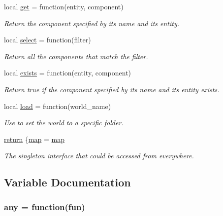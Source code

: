 \begin{DoxyCompactItemize}
local \hyperlink{world_8lua_a9c57eef25270a48365249a68581a1247}{get} = function(entity, component)
\begin{DoxyCompactList}\small\item\em Return the component specified by its name and its entity. \end{DoxyCompactList}\item 
local \hyperlink{world_8lua_ae180890d7caabe9962d544350eca4638}{select} = function(filter)
\begin{DoxyCompactList}\small\item\em Return all the components that match the filter. \end{DoxyCompactList}\item 
local \hyperlink{world_8lua_a6ba751bf71957124ec1fb2c76724448b}{exists} = function(entity, component)
\begin{DoxyCompactList}\small\item\em Return true if the component specified by its name and its entity exists. \end{DoxyCompactList}\item 
local \hyperlink{world_8lua_adaadec1ef48bb32b80ea5572e7d12ca6}{load} = function(world\-\_\-name)
\begin{DoxyCompactList}\small\item\em Use to set the world to a specific folder. \end{DoxyCompactList}\item 
\hyperlink{world_8lua_a9717e7bbecb906637e86cef6da3d83c2}{return} \{\hyperlink{world_8lua_a39ec1e5339699aba0ebc7e3bb83856e7}{map} = \hyperlink{world_8lua_a39ec1e5339699aba0ebc7e3bb83856e7}{map}
\begin{DoxyCompactList}\small\item\em The singleton interface that could be accessed from everywhere. \end{DoxyCompactList}\end{DoxyCompactItemize}


\subsection{Variable Documentation}
\hypertarget{world_8lua_abd7045ad8553e16c50a967b4d48b7f6b}{
\subsubsection[{any}]{\setlength{\rightskip}{0pt plus 5cm}any = function(fun)}}\label{world_8lua_abd7045ad8553e16c50a967b4d48b7f6b}


